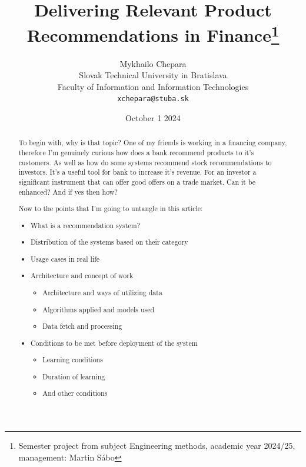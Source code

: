 \documentclass[10pt,twoside,english,a4paper]{article}
\begin{document}
\title{Delivering Relevant Product Recommendations in Finance\thanks{Semester project from subject Engineering methods, academic year 2024/25, management: Martin Sábo}} 

\author{Mykhailo Chepara\\[2pt]
	{\small Slovak Technical University in Bratislava}\\
	{\small Faculty of Information and Information Technologies}\\
	{\small \texttt{xchepara@stuba.sk}}
	}
    \date{\small October 1 2024}


\maketitle

\begin{abstract}
To begin with, why is that topic? 
One of my friends is working in a financing company, therefore I'm genuinely curious how does a bank recommend products to it's customers. As well as how do some systems recommend stock recommendations to investors. It's a useful tool for bank to increase it's revenue. For an investor a significant instrument that can offer good offers on a trade market. Can it be enhanced? And if yes then how?

Now to the points that I'm going to untangle in this article:
\begin{itemize}
    \item What is a recommendation system?
    \item Distribution of the systems based on their category
    \item Usage cases in real life
    \item Architecture and concept of work
    \begin{itemize} 
         \item Architecture and ways of utilizing data
         \item Algorithms applied and models used
         \item Data fetch and processing
    \end{itemize}
    
    \item Conditions to be met before deployment of the system
    \begin{itemize}
        \item Learning conditions
        \item Duration of learning
        \item And other conditions
    \end{itemize}
    

\end{itemize}
\end{abstract}
\end{document}
